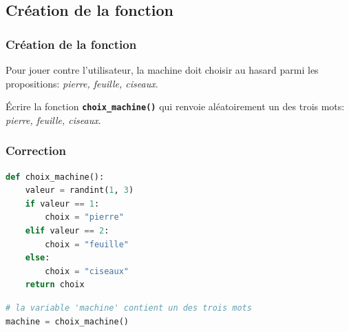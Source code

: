 \documentclass[svgnames,11pt]{beamer}
\begin{document}
\subsection{Création de la fonction}
\begin{frame}
    \frametitle{Création de la fonction}

Pour jouer contre l'utilisateur, la machine doit choisir au hasard parmi les propositions: \emph{pierre, feuille, ciseaux}.
\begin{activite}
Écrire la fonction \textbf{\texttt{choix\_machine()}} qui renvoie aléatoirement un des trois mots: \emph{pierre, feuille, ciseaux}.
\end{activite}

\end{frame}
\begin{frame}[fragile]
    \frametitle{Correction}

\begin{center}
\begin{lstlisting}[language=Python , basicstyle=\ttfamily\small, xleftmargin=2em, xrightmargin=2em]
def choix_machine():
    valeur = randint(1, 3)
    if valeur == 1:
        choix = "pierre"
    elif valeur == 2:
        choix = "feuille"
    else:
        choix = "ciseaux"
    return choix
\end{lstlisting}
\begin{lstlisting}[language=Python , basicstyle=\ttfamily\small, xleftmargin=2em, xrightmargin=2em]
# la variable 'machine' contient un des trois mots
machine = choix_machine()
\end{lstlisting}
\end{center}

\end{frame}
\end{document}
